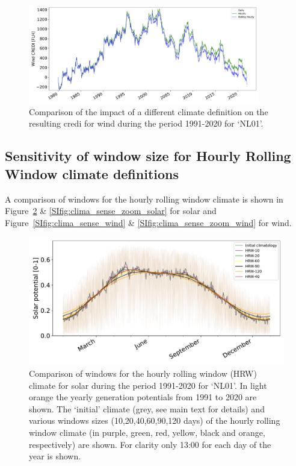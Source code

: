 \documentclass[12pt]{iopart}
\newcommand{\credi}[0]{{\sc credi}}
\begin{document}
\begin{figure}[ht!]
    \centering
    \includegraphics[width=0.9\textwidth]{Figures_SI/Fig_ClimComparison_WON}
    \caption{
    Comparison of the impact of a different climate definition on the resulting \credi{} for wind during the period 1991-2020 for `NL01'.}
    \label{SIfig:clima_impact}
\end{figure}

\clearpage






\subsection{Sensitivity of window size for Hourly Rolling Window climate definitions }\label{app:sense}
A comparison of windows for the hourly rolling window climate is shown in Figure~\ref{SIfig:clima_sense_solar} \& \ref{SIfig:clima_sense_zoom_solar} for solar and Figure~\ref{SIfig:clima_sense_wind} \& \ref{SIfig:clima_sense_zoom_wind} for wind. 

\begin{figure}[b]
    \centering
    \includegraphics[width=\textwidth]{Figures_SI/Climatology_sensitivity_solar.pdf}
    \caption{Comparison of windows for the hourly rolling window (HRW) climate for solar during the period 1991-2020 for `NL01'. In light orange the yearly generation potentials from 1991 to 2020 are shown. The `initial' climate (grey, see main text for details) and various windows sizes (10,20,40,60,90,120 days) of the hourly rolling window climate (in purple, green, red, yellow, black and orange, respectively) are shown. For clarity only 13:00 for each day of the year is shown.}
    \label{SIfig:clima_sense_solar}
\end{figure}
\end{document}
